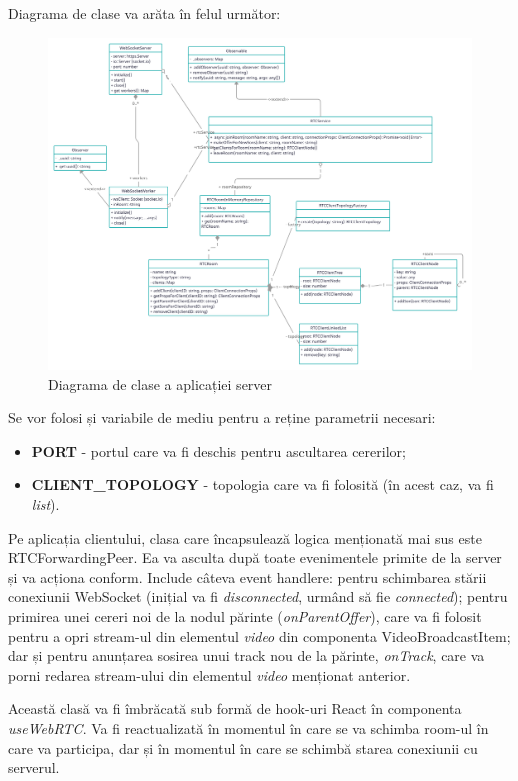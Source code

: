 \indent \par Diagrama de clase va arăta în felul următor:
\begin{figure}[H]
    \centering
    \includegraphics[width=15cm]{figures/app_class_diagram.png}
    \caption{Diagrama de clase a aplicației server}
\end{figure}
\indent \par Se vor folosi și variabile de mediu pentru a reține parametrii necesari:
\begin{itemize}
    \item \textbf{PORT} - portul care va fi deschis pentru ascultarea cererilor;
    \item \textbf{CLIENT\_TOPOLOGY} - topologia care va fi folosită (în acest caz, va fi \textit{list}).
\end{itemize}
\indent \par Pe aplicația clientului, clasa care încapsulează logica menționată mai sus este RTCForwardingPeer. Ea va asculta după toate evenimentele primite de la server și va acționa conform. Include câteva event handlere: pentru schimbarea stării conexiunii WebSocket (inițial va fi \textit{disconnected}, urmând să fie \textit{connected}); pentru primirea unei cereri noi de la nodul părinte (\textit{onParentOffer}), care va fi folosit pentru a opri stream-ul din elementul \textit{video} din componenta VideoBroadcastItem; dar și pentru anunțarea sosirea unui track nou de la părinte, \textit{onTrack}, care va porni redarea stream-ului din elementul \textit{video} menționat anterior.
\indent \par Această clasă va fi îmbrăcată sub formă de hook-uri React în componenta \textit{useWebRTC}. Va fi reactualizată în momentul în care se va schimba room-ul în care va participa, dar și în momentul în care se schimbă starea conexiunii cu serverul.
